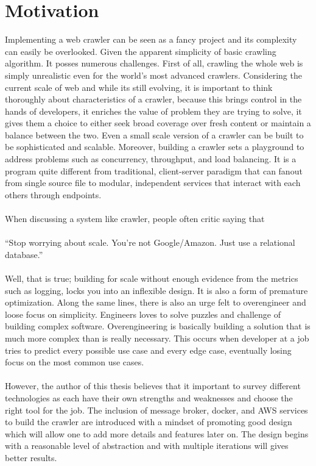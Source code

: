\section{Motivation}
Implementing a web crawler can be seen as a fancy project and its complexity can easily be overlooked.
Given the apparent simplicity of basic crawling algorithm. It posses numerous challenges. First of all,
crawling the whole web is simply unrealistic even for the world's most advanced crawlers. Considering the
current scale of web and while its still evolving, it is important to think thoroughly about
characteristics of a crawler, because this brings control in the hands of developers, it enriches the
value of problem they are trying to solve, it gives them a choice to either seek broad coverage over fresh
content or maintain a balance between the two. Even a small scale version of a crawler can be built to
be sophisticated and scalable. Moreover, building a crawler sets a playground to address problems such
as concurrency, throughput, and load balancing. It is a program quite different from traditional,
client-server paradigm that can fanout from single source file to modular, independent services that interact with each others through endpoints. 
\\
\\
When discussing a system like crawler, people often critic saying that
\\
\\
``Stop worrying about scale. You're not Google/Amazon. Just use a relational database.''
\\
\\
Well, that is true; building for scale without enough evidence from the metrics such as logging, locks you into an inflexible design. It is also a form
of premature optimization. Along the same lines, there is also an urge felt to overengineer and loose
focus on simplicity. Engineers loves to solve puzzles and challenge of building complex software. Overengineering is basically building a solution that is much more complex than is really necessary. This occurs when developer at a job tries to predict every possible use case and every edge case, eventually losing focus on the most common use cases.  
\\
\\
However, the author of this thesis believes that it important to survey different technologies as each have
their own strengths and weaknesses and choose the right tool for the job. The inclusion of message broker, docker, and AWS services to build the crawler are introduced with a mindset of promoting good design which will allow one to add more details and features later on. The design begins with a reasonable level of abstraction and with multiple iterations will gives better results.


